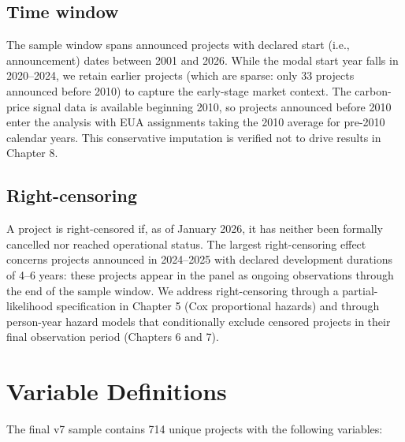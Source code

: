 \subsection{Time window}

The sample window spans announced projects with declared start (i.e., announcement) dates between 2001 and 2026. While the modal start year falls in 2020--2024, we retain earlier projects (which are sparse: only 33 projects announced before 2010) to capture the early-stage market context. The carbon-price signal data is available beginning 2010, so projects announced before 2010 enter the analysis with EUA assignments taking the 2010 average for pre-2010 calendar years. This conservative imputation is verified not to drive results in Chapter 8.

\subsection{Right-censoring}

A project is right-censored if, as of January 2026, it has neither been formally cancelled nor reached operational status. The largest right-censoring effect concerns projects announced in 2024--2025 with declared development durations of 4--6 years: these projects appear in the panel as ongoing observations through the end of the sample window. We address right-censoring through a partial-likelihood specification in Chapter 5 (Cox proportional hazards) and through person-year hazard models that conditionally exclude censored projects in their final observation period (Chapters 6 and 7).

\section{Variable Definitions}
\label{sec:ch4-variables}

The final v7 sample contains 714 unique projects with the following variables:

